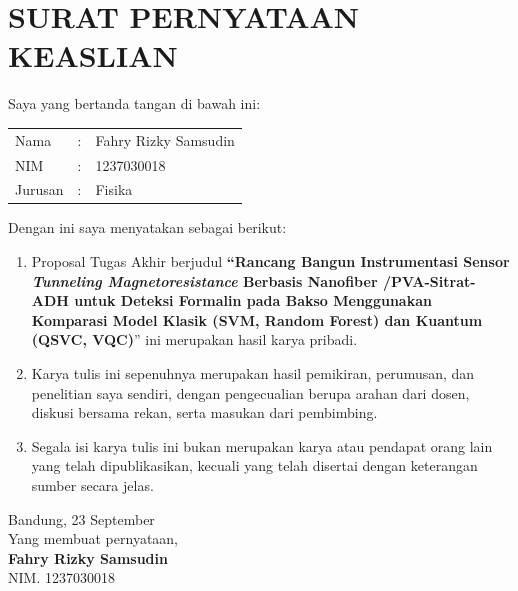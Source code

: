 \chapter*{\centering SURAT PERNYATAAN KEASLIAN}

\thispagestyle{plain}

Saya yang bertanda tangan di bawah ini:

\begin{center}
\begin{tabular}{ p{3.2cm} p{0.3cm} p{9cm} }
Nama & : & Fahry Rizky Samsudin \\
NIM & : & 1237030018 \\
Jurusan & : & Fisika \\
\end{tabular}
\end{center}

Dengan ini saya menyatakan sebagai berikut:

\begin{enumerate}[noitemsep, topsep=2pt, parsep=2pt, leftmargin=*]
    \item Proposal Tugas Akhir berjudul \textbf{“Rancang Bangun Instrumentasi Sensor \textit{Tunneling Magnetoresistance} Berbasis Nanofiber /PVA-Sitrat-ADH untuk Deteksi Formalin pada Bakso Menggunakan Komparasi Model Klasik (SVM, Random Forest) dan Kuantum (QSVC, VQC)}” ini merupakan hasil karya pribadi.
    \item Karya tulis ini sepenuhnya merupakan hasil pemikiran, perumusan, dan penelitian saya sendiri, dengan pengecualian berupa arahan dari dosen, diskusi bersama rekan, serta masukan dari pembimbing.
    \item Segala isi karya tulis ini bukan merupakan karya atau pendapat orang lain yang telah dipublikasikan, kecuali yang telah disertai dengan keterangan sumber secara jelas.
\end{enumerate}

\vspace{0.4cm}
\begin{flushright}
Bandung, 23 September \the\year{} \\  
Yang membuat pernyataan, \\[1.3cm]  
\textbf{Fahry Rizky Samsudin} \\  
NIM. 1237030018  
\end{flushright}
\newpage
